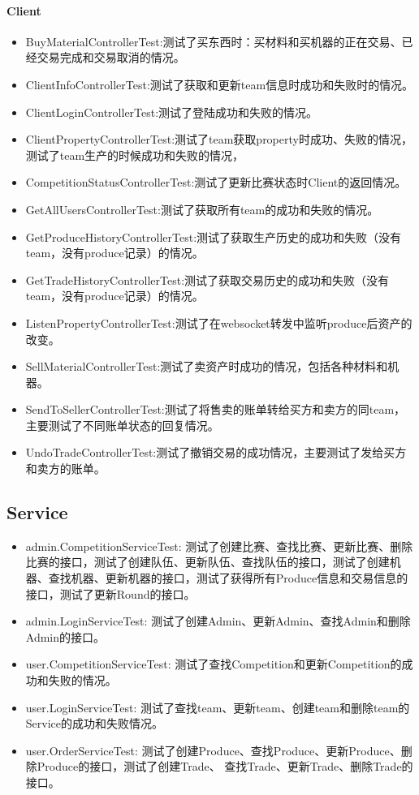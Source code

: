 \documentclass{article}
\begin{document}
						\paragraph{Client}
							\begin{itemize}
							\item BuyMaterialControllerTest:测试了买东西时：买材料和买机器的正在交易、已经交易完成和交易取消的情况。
							\item ClientInfoControllerTest:测试了获取和更新team信息时成功和失败时的情况。
							\item ClientLoginControllerTest:测试了登陆成功和失败的情况。
							\item ClientPropertyControllerTest:测试了team获取property时成功、失败的情况，测试了team生产的时候成功和失败的情况，
							\item CompetitionStatusControllerTest:测试了更新比赛状态时Client的返回情况。
							\item GetAllUsersControllerTest:测试了获取所有team的成功和失败的情况。
							\item GetProduceHistoryControllerTest:测试了获取生产历史的成功和失败（没有team，没有produce记录）的情况。
							\item GetTradeHistoryControllerTest:测试了获取交易历史的成功和失败（没有team，没有produce记录）的情况。
							\item ListenPropertyControllerTest:测试了在websocket转发中监听produce后资产的改变。
							\item SellMaterialControllerTest:测试了卖资产时成功的情况，包括各种材料和机器。
							\item SendToSellerControllerTest:测试了将售卖的账单转给买方和卖方的同team，主要测试了不同账单状态的回复情况。
							\item UndoTradeControllerTest:测试了撤销交易的成功情况，主要测试了发给买方和卖方的账单。
							\end{itemize}
					\subsection{Service}
						\begin{itemize}
							\item admin.CompetitionServiceTest: 测试了创建比赛、查找比赛、更新比赛、删除比赛的接口，测试了创建队伍、更新队伍、查找队伍的接口，测试了创建机器、查找机器、更新机器的接口，测试了获得所有Produce信息和交易信息的接口，测试了更新Round的接口。
							\item admin.LoginServiceTest: 测试了创建Admin、更新Admin、查找Admin和删除Admin的接口。
							\item user.CompetitionServiceTest: 测试了查找Competition和更新Competition的成功和失败的情况。
							\item user.LoginServiceTest: 测试了查找team、更新team、创建team和删除team的Service的成功和失败情况。
							\item user.OrderServiceTest: 测试了创建Produce、查找Produce、更新Produce、删除Produce的接口，测试了创建Trade、 查找Trade、更新Trade、删除Trade的接口。
						\end{itemize}
\end{document}
